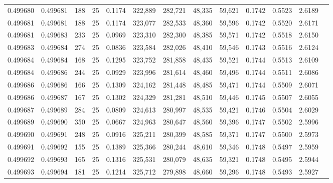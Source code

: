 \begin{tabular}{rrrrrrrrrrrrr}
0.499680 & 0.499681 & 188 &  25 &                                     0.1174 & 322,889 & 282,721 &  48,335 &  59,621 & 0.1742 & 0.5523 & 2.6189 \\
0.499681 & 0.499681 & 188 &  25 &                                     0.1174 & 323,077 & 282,533 &  48,360 &  59,596 & 0.1742 & 0.5520 & 2.6171 \\
0.499681 & 0.499683 & 233 &  25 &                                     0.0969 & 323,310 & 282,300 &  48,385 &  59,571 & 0.1742 & 0.5518 & 2.6150 \\
0.499683 & 0.499684 & 274 &  25 &                                     0.0836 & 323,584 & 282,026 &  48,410 &  59,546 & 0.1743 & 0.5516 & 2.6124 \\
0.499684 & 0.499684 & 168 &  25 &                                     0.1295 & 323,752 & 281,858 &  48,435 &  59,521 & 0.1744 & 0.5513 & 2.6109 \\
0.499684 & 0.499686 & 244 &  25 &                                     0.0929 & 323,996 & 281,614 &  48,460 &  59,496 & 0.1744 & 0.5511 & 2.6086 \\
0.499686 & 0.499686 & 166 &  25 &                                     0.1309 & 324,162 & 281,448 &  48,485 &  59,471 & 0.1744 & 0.5509 & 2.6071 \\
0.499686 & 0.499687 & 167 &  25 &                                     0.1302 & 324,329 & 281,281 &  48,510 &  59,446 & 0.1745 & 0.5507 & 2.6055 \\
0.499687 & 0.499689 & 284 &  25 &                                     0.0809 & 324,613 & 280,997 &  48,535 &  59,421 & 0.1746 & 0.5504 & 2.6029 \\
0.499689 & 0.499690 & 350 &  25 &                                     0.0667 & 324,963 & 280,647 &  48,560 &  59,396 & 0.1747 & 0.5502 & 2.5996 \\
0.499690 & 0.499691 & 248 &  25 &                                     0.0916 & 325,211 & 280,399 &  48,585 &  59,371 & 0.1747 & 0.5500 & 2.5973 \\
0.499691 & 0.499692 & 155 &  25 &                                     0.1389 & 325,366 & 280,244 &  48,610 &  59,346 & 0.1748 & 0.5497 & 2.5959 \\
0.499692 & 0.499693 & 165 &  25 &                                     0.1316 & 325,531 & 280,079 &  48,635 &  59,321 & 0.1748 & 0.5495 & 2.5944 \\
0.499693 & 0.499694 & 181 &  25 &                                     0.1214 & 325,712 & 279,898 &  48,660 &  59,296 & 0.1748 & 0.5493 & 2.5927 \\

\end{tabular}
